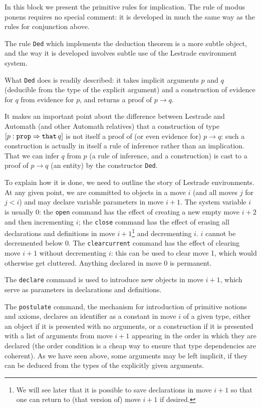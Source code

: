 \documentclass[12pt]{article}
\begin{document}
In this block we present the primitive rules for implication.  The rule of modus ponens requires no special comment:  it is developed in much the same way as
the rules for conjunction above.

The rule {\tt Ded} which implements the deduction theorem is a more subtle object, and the way it is developed involves subtle use of the Lestrade environment system.

What {\tt Ded} does is readily described:  it takes implicit arguments $p$ and $q$ (deducible from the type of the explicit argument) and a construction of evidence for $q$ from evidence for $p$, and returns a proof of $p \rightarrow q$.

It makes an important point about the difference between Lestrade and Automath (and other Automath relatives) that a construction of type \newline $[p:{\tt prop} \Rightarrow {\tt that} \,q]$ is not itself a proof of (or even evidence for) $p \rightarrow q$:  such a construction is actually in itself a rule of inference rather than an implication.  That we can infer $q$ from $p$ (a rule of inference, and a construction) is cast to a proof of $p\rightarrow q$ (an entity) by the constructor {\tt Ded}.

To explain how it is done, we need to outline the story of Lestrade environments.  At any given point, we are committed to objects in a move $i$ (and all moves $j$ for $j<i$) and may declare variable parameters in
move $i+1$.  The system variable $i$ is usually 0:  the {\tt open} command has the effect of creating a new empty move $i+2$ and then incrementing $i$;  the {\tt close} command has
the effect of erasing all declarations and definitions in move $i+1$\footnote{We will see later that it is possible to save declarations in move $i+1$ so that one can return to (that version of) move $i+1$ if desired.} and decrementing $i$.  $i$ cannot be decremented below 0.  The {\tt clearcurrent} command has the effect
of clearing move $i+1$ without decrementing $i$:  this can be used to clear move 1, which would otherwise get cluttered.  Anything declared in move 0 is permanent.

The {\tt declare} command is used to introduce new objects in move $i+1$, which serve as parameters in declarations and definitions.

The {\tt postulate} command, the mechanism for introduction of primitive notions and axioms,  declares an identifier as a constant in move $i$ of a given type, either an object if it is presented with no arguments, or a construction if it is presented
with a list of arguments from move $i+1$ appearing in the order in which they are declared (the order condition is  a cheap way to ensure that type dependencies are coherent).  As we have seen above, some arguments may be left implicit, if they can be deduced from the types of the explicitly given arguments.
\end{document}
